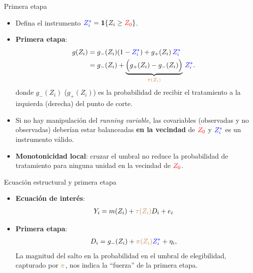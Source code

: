 \documentclass[10pt, xcolor=dvipsnames]{beamer}
\begin{document}
\begin{frame}{Primera etapa}
\begin{itemize}\setlength{\itemsep}{0.75em}
    \item Defina el instrumento \(\textcolor{blue}{Z_i^*}=\mathbf{1}\{Z_i\ge \textcolor{red}{Z_0}\}\).
    \pause
    \item \textbf{Primera etapa}:
    {\small
  \begin{align*} 
  \begin{split}     
    g(Z_i) &= g_-(Z_i) (1-\textcolor{blue}{Z_i^*}) + g_+(Z_i)\,\textcolor{blue}{Z_i^*} \\
           &= g_-(Z_i) + \underbrace{\Big(g_+(Z_i)-g_-(Z_i)\Big)}_{\textcolor{brown}{\pi(Z_i)}}\,\textcolor{blue}{Z_i^*}.
  \end{split}
  \end{align*}
  }
    donde \(g_-(Z_i)\) (\(g_+(Z_i)\))  es la probabilidad de recibir el tratamiento a la izquierda (derecha) del punto de corte.
	\pause
	\item Si no hay manipulación del \emph{running variable}, las covariables (observadas y no observadas) deberían estar balanceadas \textbf{en la vecindad} de $\textcolor{red}{Z_0}$ y \(\textcolor{blue}{Z_i^*}\) es un instrumento válido.
	\pause
	\item  \textbf{Monotonicidad local}: cruzar el umbral no reduce la probabilidad de tratamiento para ninguna unidad en la vecindad de $\textcolor{red}{Z_0}$.
\end{itemize}	
\end{frame}


\begin{frame}{Ecuación estructural y primera etapa}
    \begin{itemize}
        \item \textbf{Ecuación de interés}: \vspace{-0.3cm}
        \begin{align*}
            Y_i = m(Z_i) + \textcolor{brown}{\tau(Z_i)} D_i + e_i
        \end{align*}
	\item \textbf{Primera etapa}: \vspace{-0.3cm}
	\begin{align*}
	   D_i = g_-(Z_i) + \textcolor{brown}{\pi(Z_i)} \textcolor{blue}{Z^*_i} + \eta_i,
	\end{align*}
	La magnitud del salto en la probabilidad en el umbral de elegibilidad, capturado por $\textcolor{brown}{\pi}$, nos indica la ``fuerza'' de la primera etapa.
	\end{itemize}	
\end{frame}
\end{document}
